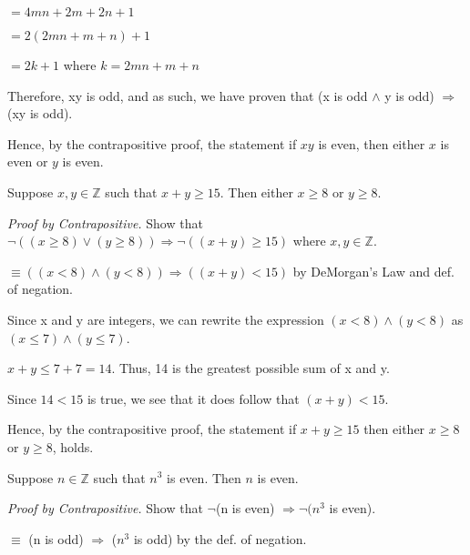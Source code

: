 \documentclass[a4paper,11pt]{article}
\begin{document}
$= 4mn + 2m + 2n + 1$

$ = 2(2mn + m + n) + 1 $

$= 2k + 1$ where $k = 2mn + m + n$

Therefore, xy is odd, and as such, we have proven that (x is odd $\land$ y is odd) $\Rightarrow$ (xy is odd).

\phantom{}

Hence, by the contrapositive proof, the statement if $xy$ is even, then either $x$ is even or $y$ is even.   \fbox \\

\begin{required}
Suppose $x, y \in \mathbb{Z}$ such that $x + y \geq 15$. Then either $x \geq 8$ or $y \geq 8$. 
\end{required}
\emph{Proof by Contrapositive.} Show that $\neg((x \geq 8) \vee (y \geq 8)) \Rightarrow \neg((x+y) \geq 15)$ where $x,y \in \mathbb{Z}$.

$\equiv ((x < 8) \land (y < 8)) \Rightarrow ((x+y) < 15)$ by DeMorgan's Law and def. of negation.

\phantom{}

Since x and y are integers, we can rewrite the expression $(x < 8) \land (y < 8)$ as $(x \leq 7) \land (y \leq 7)$.

$x+y \leq 7+7 = 14$. Thus, 14 is the greatest possible sum of x and y. %

Since $14 < 15$ is true, we see that it does follow that $(x+y) < 15$.

\phantom{}

Hence, by the contrapositive proof, the statement if $x + y \geq 15$ then either $x \geq 8$ or $y \geq 8$, holds.   \fbox \\

\begin{required}
Suppose $n \in \mathbb{Z}$ such that $n^{3}$ is even. Then $n$ is even.
\end{required}
\emph{Proof by Contrapositive.} Show that $\neg$(n is even) $\Rightarrow \neg(n^3$ is even). 

$\equiv$ (n is odd) $\Rightarrow$ ($n^3$ is odd) by the def. of negation.
\end{document}
